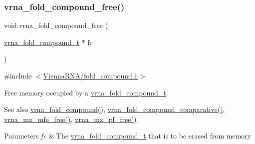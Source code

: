 \subsubsection{\texorpdfstring{vrna\+\_\+fold\+\_\+compound\+\_\+free()}{vrna\_fold\_compound\_free()}}
{\footnotesize\ttfamily void vrna\+\_\+fold\+\_\+compound\+\_\+free (\begin{DoxyParamCaption}\item[{\hyperlink{group__fold__compound_ga1b0cef17fd40466cef5968eaeeff6166}{vrna\+\_\+fold\+\_\+compound\+\_\+t} $\ast$}]{fc }\end{DoxyParamCaption})}



{\ttfamily \#include $<$\hyperlink{fold__compound_8h}{Vienna\+R\+N\+A/fold\+\_\+compound.\+h}$>$}



Free memory occupied by a \hyperlink{group__fold__compound_ga1b0cef17fd40466cef5968eaeeff6166}{vrna\+\_\+fold\+\_\+compound\+\_\+t}. 

\begin{DoxySeeAlso}{See also}
\hyperlink{group__fold__compound_ga6601d994ba32b11511b36f68b08403be}{vrna\+\_\+fold\+\_\+compound()}, \hyperlink{group__fold__compound_gad6bacc816af274922b13d947f708aa0c}{vrna\+\_\+fold\+\_\+compound\+\_\+comparative()}, \hyperlink{group__dp__matrices_ga6a9422feb5dfe5c64050cebf447672d0}{vrna\+\_\+mx\+\_\+mfe\+\_\+free()}, \hyperlink{group__dp__matrices_ga2283e69fd139fb8e58d7ade3b5773f9c}{vrna\+\_\+mx\+\_\+pf\+\_\+free()}
\end{DoxySeeAlso}

\begin{DoxyParams}{Parameters}
{\em fc} & The \hyperlink{group__fold__compound_ga1b0cef17fd40466cef5968eaeeff6166}{vrna\+\_\+fold\+\_\+compound\+\_\+t} that is to be erased from memory \\
\hline
\end{DoxyParams}
\mbox{\label{group__fold__compound_gafc44c76a1aacf61bfccb8cd698772b98}} 
